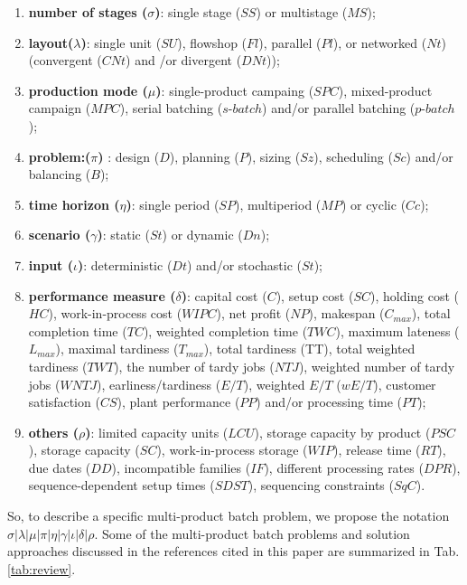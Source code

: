\documentclass[10pt,fleqn,a4paper,twoside]{article}
\begin{document}
\begin{enumerate}[label=\arabic*)]
\item \textbf{number of stages ($\sigma$)}: single stage ($SS$) or multistage ($MS$);
\item \textbf{layout($\lambda$)}: single unit ($SU$), flowshop ($Fl$), parallel ($Pl$), or networked ($Nt$) (convergent ($CNt$) and /or divergent ($DNt$));
\item \textbf{production mode ($\mu$)}: single-product campaing ($SPC$), mixed-product campaign ($MPC$), serial batching ($s\textrm{-}batch$) and/or parallel batching ($p\textrm{-}batch$);
\item \textbf{problem:($\pi$)}  : design ($D$), planning ($P$), sizing ($Sz$), scheduling ($Sc$) and/or balancing ($B$); 
\item \textbf{time horizon ($\eta$)}: single period ($SP$), multiperiod ($MP$) or cyclic ($Cc$);
\item \textbf{scenario ($\gamma$)}: static ($St$) or dynamic ($Dn$);
\item \textbf{input ($\iota$)}: deterministic ($Dt$) and/or stochastic ($St$);
\item \textbf{performance measure ($\delta$)}: capital cost ($C$), setup cost ($SC$), holding cost ($HC$), work-in-process cost ($WIPC$), net profit ($NP$), makespan ($C_{max}$), total completion time ($TC$), weighted completion time ($TWC$), maximum lateness ($L_{max}$), maximal tardiness ($T_{max}$), total tardiness (TT), total weighted tardiness ($TWT$), the number of tardy jobs ($NTJ$), weighted number of tardy jobs ($WNTJ$), earliness/tardiness ($E/T$), weighted $E/T$ ($wE/T$), customer satisfaction ($CS$), plant performance ($PP$) and/or processing time ($PT$);
\item \textbf{others ($\rho$)}: limited capacity units ($LCU$), storage capacity by product ($PSC$), storage capacity ($SC$), work-in-process storage ($WIP$), release time ($RT$), due dates ($DD$), incompatible families ($IF$), different processing rates ($DPR$), sequence-dependent setup times ($SDST$), sequencing constraints ($SqC$).
\end{enumerate}

So, to describe a speciﬁc multi-product batch problem, we propose the notation $\sigma|\lambda|\mu|\pi|\eta|\gamma|\iota|\delta|\rho$. Some of the multi-product batch problems and solution approaches discussed in the references cited in this paper are summarized in Tab. \ref{tab:review}.
\end{document}
